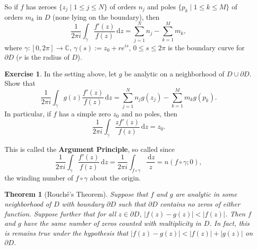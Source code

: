 \documentclass[12pt]{article}
\newcommand{\cx}{\mathbb{C}}
\newtheorem{theorem}{Theorem}[section]
\theoremstyle{definition}
\newtheorem{exercise}{Exercise}
\theoremstyle{remark}
\begin{document}
So if $f$ has zeroes $\{z_j\mid1\leq j\leq N\}$ of orders $n_j$ and poles $\{p_k\mid1\leq k\leq M\}$ of orders $m_k$ in $D$ (none lying on the boundary), then 
\begin{equation}
    \frac{1}{2\pi i}\int_{\gamma}\frac{f'(z)}{f(z)}\,\mathrm{d}z=\sum\limits_{j=1}^Nn_j-\sum\limits_{k=1}^Mm_k,
\end{equation}
where $\gamma:[0,2\pi]\to\cx$, $\gamma(s):=z_0+re^{is}$, $0\leq s\leq2\pi$ is the boundary curve for $\partial D$ ($r$ is the radius of $D$). 
\begin{exercise}
    In the setting above, let $g$ be analytic on a neighborhood of $D\cup\partial D$. Show that 
    \begin{equation}
        \frac{1}{2\pi i}\int_{\gamma}g(z)\frac{f'(z)}{f(z)}\,\mathrm{d}z=\sum\limits_{j=1}^Nn_jg(z_j)-\sum\limits_{k=1}^Mm_kg(p_k).
    \end{equation}
    In particular, if $f$ has a simple zero $z_0$ and no poles, then 
    \begin{equation}
        \frac{1}{2\pi i}\int_{\gamma}\frac{zf'(z)}{f(z)}\,\mathrm{d}z=z_0.
    \end{equation}
\end{exercise}
This is called the \textbf{Argument Principle}, so called since 
\begin{equation}
    \frac{1}{2\pi i}\int_{\gamma}\frac{f'(z)}{f(z)}\,\mathrm{d}z=\frac{1}{2\pi i}\int_{f\circ\gamma}\frac{\,\mathrm{d}z}{z}=n(f\circ\gamma;0),
\end{equation}
the winding number of $f\circ\gamma$ about the origin.
\begin{theorem}[Rouch\'e's Theorem]
    Suppose that $f$ and $g$ are analytic in some neighborhood of $D$ with boundary $\partial D$ such that $\partial D$ contains no zeros of either function. Suppose further that for all $z\in\partial D$, $|f(z)-g(z)|<|f(z)|$. Then $f$ and $g$ have the same number of zeros counted with multiplicity in $D$. In fact, this is remains true under the hypothesis that $|f(z)-g(z)|<|f(z)|+|g(z)|$ on $\partial D$.
\end{theorem}
\end{document}
